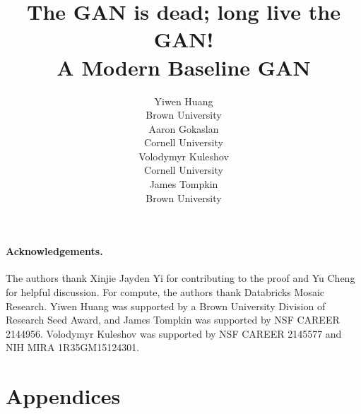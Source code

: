 \documentclass{article}
\title{The GAN is dead; long live the GAN!\\A Modern Baseline GAN}
\author{%
  Yiwen Huang\\
  Brown University \\
  \And
  Aaron Gokaslan \\
  Cornell University \\
  \And
  Volodymyr Kuleshov \\
  Cornell University \\
  \And
  James Tompkin \\
  Brown University \\
}
\begin{document}
\maketitle









\paragraph{Acknowledgements.}
The authors thank Xinjie Jayden Yi for contributing to the proof and Yu Cheng for helpful discussion. For compute, the authors thank Databricks Mosaic Research. Yiwen Huang was supported by a Brown University Division of Research Seed Award, and James Tompkin was supported by NSF CAREER 2144956. Volodymyr Kuleshov
was supported by NSF CAREER 2145577 and NIH MIRA 1R35GM15124301.

{\small

%

%
}

\appendix
\clearpage
\section*{Appendices}



\clearpage

\end{document}
